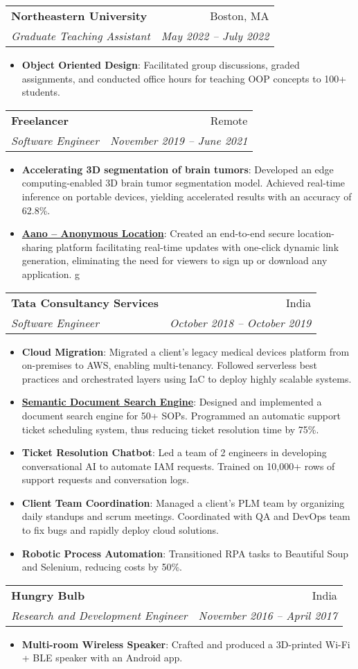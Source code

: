 \documentclass[letterpaper,10pt]{article}
\makeatletter
\newcommand{\resumeItem}[2]{
    \item\small{
        \textbf{#1}{: #2 \vspace{-2pt}}
    }
}
\newcommand{\resumeSubheading}[4]{
    \vspace{-1pt}\item
    \begin{tabular*}{0.97\textwidth}{l@{\extracolsep{\fill}}r}
        \textbf{#1}       & #2                 \\
        \textit{\small#3} & \textit{\small #4} \\
    \end{tabular*}\vspace{-5pt}
}
\newcommand{\resumeSubItem}[2]{\resumeItem{#1}{#2}\vspace{-4pt}}
\newcommand{\resumeItemListStart}{\begin{itemize}}
\newcommand{\resumeItemListEnd}{\end{itemize}\vspace{-5pt}}
\makeatother
\begin{document}
	\resumeSubheading
	{Northeastern University}{Boston, MA}
	{Graduate Teaching Assistant}{May 2022 -- July 2022}
	\resumeItemListStart
		\resumeItem{Object Oriented Design}
			{Facilitated group discussions, graded assignments, and conducted office hours for teaching OOP concepts to 100+ students.}
	\resumeItemListEnd
	
	\resumeSubheading
	{Freelancer}{Remote}
	{Software Engineer}{November 2019 -- June 2021}
	\resumeItemListStart
		\resumeSubItem{Accelerating 3D segmentation of brain tumors}
			{Developed an edge computing-enabled 3D brain tumor segmentation model. Achieved real-time inference on portable devices, yielding accelerated results with an accuracy of 62.8\%.}
		\resumeItem{\href{https://github.com/chakrabortyde/aano}{Aano -- Anonymous Location}}
			{Created an end-to-end secure location-sharing platform facilitating real-time updates with one-click dynamic link generation, eliminating the need for viewers to sign up or download any application.}g
	\resumeItemListEnd
	
	\resumeSubheading
	{Tata Consultancy Services}{India}
	{Software Engineer}{October 2018 -- October 2019}
	\resumeItemListStart
		\resumeItem{Cloud Migration}
			{Migrated a client’s legacy medical devices platform from on-premises to AWS, enabling multi-tenancy. Followed serverless best practices and orchestrated layers using IaC to deploy highly scalable systems.}
		\resumeItem{\href{https://github.com/chakrabortyde/document-search-engine}{Semantic Document Search Engine}}
			{Designed and implemented a document search engine for 50+ SOPs. Programmed an automatic support ticket scheduling system, thus reducing ticket resolution time by 75\%.}
		\resumeItem{Ticket Resolution Chatbot}
			{Led a team of 2 engineers in developing conversational AI to automate IAM requests. Trained on 10,000+ rows of support requests and conversation logs.}
		\resumeItem{Client Team Coordination}
			{Managed a client’s PLM team by organizing daily standups and scrum meetings. Coordinated with QA and DevOps team to fix bugs and rapidly deploy cloud solutions.}
		\resumeItem{Robotic Process Automation}
			{Transitioned RPA tasks to Beautiful Soup and Selenium, reducing costs by 50\%.}
	\resumeItemListEnd
	
	\resumeSubheading
	{Hungry Bulb}{India}
	{Research and Development Engineer}{November 2016 -- April 2017}
	\resumeItemListStart
		\resumeItem{Multi-room Wireless Speaker}
			{Crafted and produced a 3D-printed Wi-Fi + BLE speaker with an Android app.}
	\resumeItemListEnd
	
\end{document}
